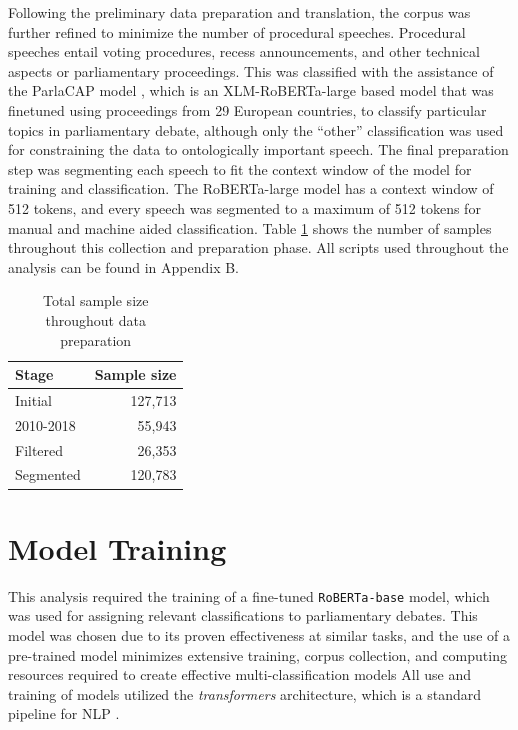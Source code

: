Following the preliminary data preparation and translation, the corpus was further refined to minimize the number of procedural speeches. Procedural speeches entail voting procedures, recess announcements, and other technical aspects or parliamentary proceedings. This was classified with the assistance of the ParlaCAP model \citet{parlacap_model}, which is an XLM-RoBERTa-large based model that was finetuned using proceedings from 29 European countries, to classify particular topics in parliamentary debate, although only the ``other'' classification was used for constraining the data to ontologically important speech. The final preparation step was segmenting each speech to fit the context window of the model for training and classification. The RoBERTa-large model has a context window of 512 tokens, and every speech was segmented to a maximum of 512 tokens for manual and machine aided classification. Table \ref{tab:sample_size} shows the number of samples throughout this collection and preparation phase. All scripts used throughout the analysis can be found in Appendix B.



\begin{table}[h]
    \centering
    \caption{Total sample size throughout data preparation}
    \begin{tabular}{lr}
        \toprule
        Stage & Sample size \\
        \midrule
        Initial & 127,713 \\
        2010-2018 & 55,943 \\
        Filtered & 26,353 \\
        Segmented & 120,783 \\
        \bottomrule
    \end{tabular}
    \label{tab:sample_size}

\end{table}

\section{Model Training}
\label{sec:model_training}

This analysis required the training of a fine-tuned \texttt{RoBERTa-base} model, which was used for assigning relevant classifications to parliamentary debates. This model was chosen due to its proven effectiveness at similar tasks, and the use of a pre-trained model minimizes extensive training, corpus collection, and computing resources required to create effective multi-classification models \citep[pg.~2-3]{burst2024,timoneda2025} All use and training of models utilized the \textit{transformers} architecture, which is a standard pipeline for \ac{NLP} \citep[pg.~38-40]{wolf2020}. 



